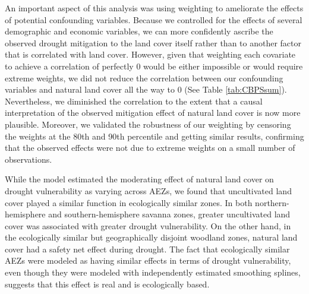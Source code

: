 \documentclass{article}
\begin{document}
An important aspect of this analysis was using weighting to ameliorate the effects of potential confounding variables.  Because we controlled for the effects of several demographic and economic variables, we can more confidently ascribe the observed drought mitigation to the land cover itself rather than to another factor that is correlated with land cover.  However, given that weighting each covariate to achieve a correlation of perfectly 0 would be either impossible or would require extreme weights, we did not reduce the correlation between our confounding variables and natural land cover all the way to 0 (See Table \ref{tab:CBPSsum}).  Nevertheless, we diminished the correlation to the extent that a causal interpretation of the observed mitigation effect of natural land cover is now more plausible. Moreover, we validated the robustness of our weighting by censoring the weights at the 80th and 90th percentile and getting similar results, confirming that the observed effects were not due to extreme weights on a small number of observations.

While the model estimated the moderating effect of natural land cover on drought vulnerability as varying across AEZs, we found that uncultivated land cover played a similar function in ecologically similar zones.  In both northern-hemisphere and southern-hemisphere savanna zones, greater uncultivated land cover was associated with greater drought vulnerability.  On the other hand, in the ecologically similar but geographically disjoint woodland zones, natural land cover had a safety net effect during drought.  The fact that ecologically similar AEZs were modeled as having similar effects in terms of drought vulnerability, even though they were modeled with independently estimated smoothing splines, suggests that this effect is real and is ecologically based.
\end{document}

